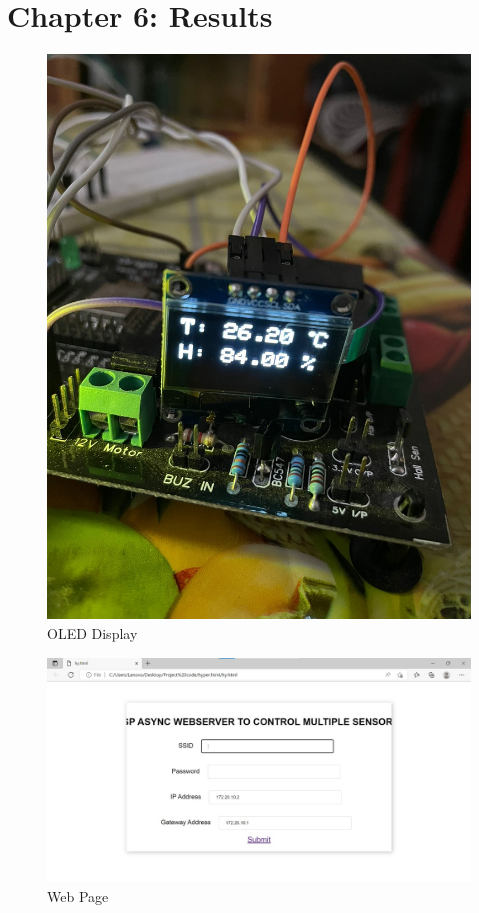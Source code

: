 \documentclass[12pt,a4paper,twocolumn,fleqn]{article}
\begin{document}
\section{Chapter 6: Results}
\begin{figure} [H]
\includegraphics[width=15cm]{media/OLED display.jpeg}
\centering
\caption{OLED Display}
\end{figure}
\begin{figure} [H]
\includegraphics[width=15cm]{media/WebPage.jpeg}
\centering
\caption{Web Page}
\end{figure}
\end{document}
